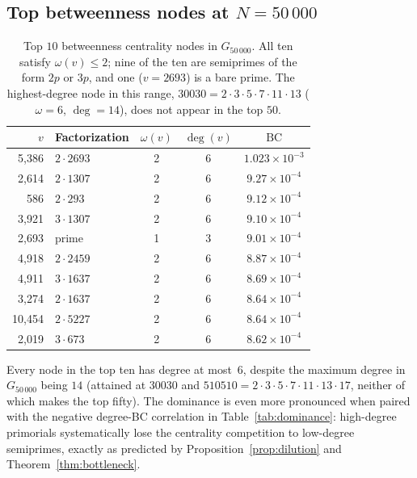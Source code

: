 \documentclass[11pt]{article}
\theoremstyle{plain}
\theoremstyle{definition}
\newcommand{\BC}{\mathrm{BC}}
\begin{document}
\subsection{Top betweenness nodes at $N = 50\,000$}

\begin{table}[ht]
\centering
\caption{Top $10$ betweenness centrality nodes in $G_{50\,000}$. All ten satisfy
$\omega(v) \le 2$; nine of the ten are semiprimes of the form $2p$ or $3p$, and one ($v = 2693$) is a bare prime.
The highest-degree node in this range, $30030 = 2 \cdot 3 \cdot 5 \cdot 7 \cdot 11 \cdot 13$ ($\omega = 6$, $\deg = 14$),
does not appear in the top $50$.}\label{tab:top10}
\begin{tabular}{@{}rlccc@{}}
\toprule
$v$ & Factorization & $\omega(v)$ & $\deg(v)$ & $\BC$ \\
\midrule
5{,}386  & $2 \cdot 2693$  & 2 & 6 & $1.023 \times 10^{-3}$ \\
2{,}614  & $2 \cdot 1307$  & 2 & 6 & $9.27 \times 10^{-4}$ \\
586      & $2 \cdot 293$   & 2 & 6 & $9.12 \times 10^{-4}$ \\
3{,}921  & $3 \cdot 1307$  & 2 & 6 & $9.10 \times 10^{-4}$ \\
2{,}693  & prime           & 1 & 3 & $9.01 \times 10^{-4}$ \\
4{,}918  & $2 \cdot 2459$  & 2 & 6 & $8.87 \times 10^{-4}$ \\
4{,}911  & $3 \cdot 1637$  & 2 & 6 & $8.69 \times 10^{-4}$ \\
3{,}274  & $2 \cdot 1637$  & 2 & 6 & $8.64 \times 10^{-4}$ \\
10{,}454 & $2 \cdot 5227$  & 2 & 6 & $8.64 \times 10^{-4}$ \\
2{,}019  & $3 \cdot 673$   & 2 & 6 & $8.62 \times 10^{-4}$ \\
\bottomrule
\end{tabular}
\end{table}

Every node in the top ten has degree at most~$6$, despite the maximum degree in $G_{50\,000}$ being $14$
(attained at $30030$ and $510510 = 2 \cdot 3 \cdot 5 \cdot 7 \cdot 11 \cdot 13 \cdot 17$, neither of which makes the top fifty).
The dominance is even more pronounced when paired with the negative degree-BC correlation in Table~\ref{tab:dominance}:
high-degree primorials systematically lose the centrality competition to low-degree semiprimes,
exactly as predicted by Proposition~\ref{prop:dilution} and Theorem~\ref{thm:bottleneck}.
\end{document}
